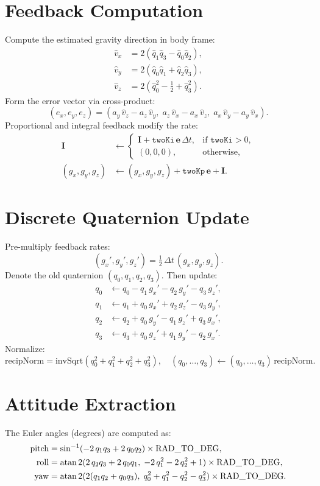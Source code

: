 \documentclass[12pt,letterpaper]{article}
\begin{document}
\section{Feedback Computation}
Compute the estimated gravity direction in body frame:
\[
\begin{aligned}
\hat v_x &= 2(\hat q_1\hat q_3 - \hat q_0\hat q_2),\\
\hat v_y &= 2(\hat q_0\hat q_1 + \hat q_2\hat q_3),\\
\hat v_z &= 2(\hat q_0^2 - \tfrac12 + \hat q_3^2).
\end{aligned}
\]
Form the error vector via cross-product:
\[
(e_x,e_y,e_z)
= (a_y\,\hat v_z - a_z\,\hat v_y,\;
  a_z\,\hat v_x - a_x\,\hat v_z,\;
  a_x\,\hat v_y - a_y\,\hat v_x).
\]
Proportional and integral feedback modify the rate:
\[
\begin{aligned}
\mathbf I &\leftarrow
\begin{cases}
\mathbf I + \texttt{twoKi}\, \mathbf e\,\Delta t, &\text{if }\texttt{twoKi}>0,\\
(0,0,0), &\text{otherwise},
\end{cases}\\
(g_x,g_y,g_z) &\leftarrow (g_x,g_y,g_z)
+ \texttt{twoKp}\,\mathbf e
+ \mathbf I.
\end{aligned}
\]

\section{Discrete Quaternion Update}
Pre-multiply feedback rates:
\[
(g_x',g_y',g_z') = \tfrac12\,\Delta t\,(g_x,g_y,g_z).
\]
Denote the old quaternion $(q_0,q_1,q_2,q_3)$.  Then update:
\[
\begin{aligned}
q_0 &\leftarrow q_0 - q_1\,g_x' - q_2\,g_y' - q_3\,g_z',\\
q_1 &\leftarrow q_1 + q_0\,g_x' + q_2\,g_z' - q_3\,g_y',\\
q_2 &\leftarrow q_2 + q_0\,g_y' - q_1\,g_z' + q_3\,g_x',\\
q_3 &\leftarrow q_3 + q_0\,g_z' + q_1\,g_y' - q_2\,g_x'.
\end{aligned}
\]
Normalize:
\[
\text{recipNorm} = \mathrm{invSqrt}(q_0^2+q_1^2+q_2^2+q_3^2),\quad
(q_0,\dots,q_3)\leftarrow(q_0,\dots,q_3)\,\text{recipNorm}.
\]

\section{Attitude Extraction}
The Euler angles (degrees) are computed as:
\[
\begin{aligned}
\text{pitch} &=
\sin^{-1}(-2\,q_1q_3 + 2\,q_0q_2)\times\mathrm{RAD\_TO\_DEG},\\
\text{roll}  &=
\atan2(2\,q_2q_3 + 2\,q_0q_1,\;
       -2\,q_1^2 -2\,q_2^2 +1)\times\mathrm{RAD\_TO\_DEG},\\
\text{yaw}   &=
\atan2(2(q_1q_2+q_0q_3),\;
       q_0^2+q_1^2 - q_2^2 - q_3^2)\times\mathrm{RAD\_TO\_DEG}.
\end{aligned}
\]
\end{document}
